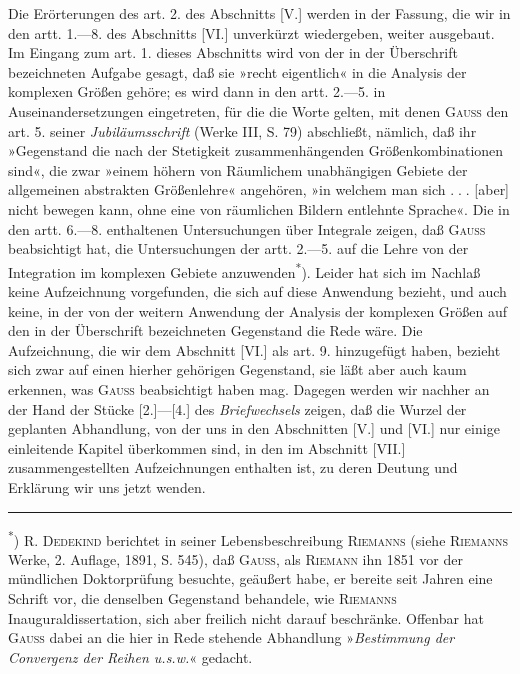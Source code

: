 \indent Die Erörterungen des art. 2. des Abschnitts [V.] werden in der  Fassung, die wir in den artt. 1.—8. des Abschnitts [VI.] unverkürzt wiedergeben, weiter ausgebaut. Im Eingang zum art. 1. dieses Abschnitts wird von der in der Überschrift bezeichneten Aufgabe gesagt, daß sie »recht eigentlich« in die Analysis der komplexen Größen gehöre; es wird dann in den artt. 2.—5. in Auseinandersetzungen eingetreten, für die die Worte gelten, mit denen \textsc{Gauss} den art. 5. seiner \textit{Jubiläumsschrift} (Werke III, S. 79) abschließt, nämlich, daß ihr »Gegenstand die nach der Stetigkeit zusammenhängenden Größenkombinationen sind«, die zwar »einem höhern von Räumlichem unabhängigen Gebiete der allgemeinen abstrakten Größenlehre« angehören, »in welchem man sich \({.}\;{.}\;{.}\) [aber] nicht bewegen kann, ohne eine von räumlichen Bildern entlehnte Sprache«. Die in den artt. 6.—8. enthaltenen Untersuchungen über Integrale zeigen, daß \textsc{Gauss} beabsichtigt hat, die Untersuchungen der artt. 2.—5. auf die Lehre von der Integration im komplexen Gebiete anzuwenden\textsuperscript{*}). Leider hat sich im Nachlaß keine Aufzeichnung vorgefunden, die sich auf diese Anwendung bezieht, und auch keine, in der von der weitern Anwendung der Analysis der komplexen Größen auf den in der Überschrift bezeichneten Gegenstand die Rede wäre. Die Aufzeichnung, die wir dem Abschnitt [VI.] als art. 9. hinzugefügt haben, bezieht sich zwar auf einen hierher gehörigen Gegenstand, sie läßt aber auch kaum erkennen, was \textsc{Gauss} beabsichtigt haben mag. Dagegen werden wir nachher an der Hand der Stücke [2.]—[4.] des \textit{Briefwechsels} zeigen, daß die Wurzel der geplanten Abhandlung, von der uns in den Abschnitten [V.] und [VI.] nur einige einleitende Kapitel überkommen sind, in den im Abschnitt [VII.] zusammengestellten Aufzeichnungen enthalten ist, zu deren Deutung und Erklärung wir uns jetzt wenden.
\par\medskip\noindent\rule{.24\linewidth}{.4pt}\par\smallskip
\noindent\hspace*{\parindent}\textsuperscript{*}) R. \textsc{Dedekind} berichtet in seiner Lebensbeschreibung \textsc{Riemanns} (siehe \textsc{Riemanns} Werke, 2. Auflage, 1891, S. 545), daß \textsc{Gauss}, als \textsc{Riemann} ihn 1851 vor der mündlichen Doktorprüfung besuchte, geäußert habe, er bereite seit Jahren eine Schrift vor, die denselben Gegenstand behandele, wie \textsc{Riemanns} Inauguraldissertation, sich aber freilich nicht darauf beschränke. Offenbar hat \textsc{Gauss} dabei an die hier in Rede stehende Abhandlung »\textit{Bestimmung der Convergenz der Reihen u.s.w.}« gedacht.
\par\endgroup
{}
